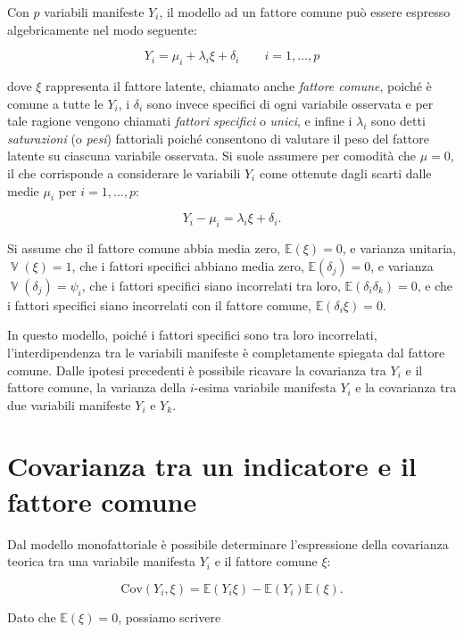 \documentclass[
  11pt,
]{krantz}
\DeclareMathOperator{\V}{\mathbb{V}} %
\newcommand{\E}{\mathbb{E}} %
\theoremstyle{definition}
\theoremstyle{definition}
\theoremstyle{definition}
\theoremstyle{definition}
\theoremstyle{remark}
\begin{document}
Con \(p\) variabili manifeste \(Y_i\), il modello ad un fattore comune può essere espresso algebricamente nel modo seguente:

\[
Y_i = \mu_i + \lambda_{i} \xi + \delta_i \qquad i=1, \dots, p
\]

dove \(\xi\) rappresenta il fattore latente, chiamato anche \emph{fattore comune}, poiché è comune a tutte le \(Y_i\), i \(\delta_i\) sono invece specifici di ogni variabile osservata e per tale ragione vengono chiamati \emph{fattori specifici} o \emph{unici}, e infine i \(\lambda_i\) sono detti \emph{saturazioni} (o \emph{pesi}) fattoriali poiché consentono di valutare il peso del fattore latente su ciascuna variabile osservata. Si suole assumere per comodità che \(\mu=0\), il che corrisponde a considerare le variabili \(Y_i\) come ottenute dagli scarti dalle medie \(\mu_i\) per \(i = 1, \dots, p\):

\[
Y_i -\mu_i = \lambda_i \xi + \delta_i.
\]

Si assume che il fattore comune abbia media zero, \(\E(\xi)=0\), e varianza unitaria, \(\V(\xi)=1\), che i fattori specifici abbiano media zero, \(\E(\delta_j)=0\), e varianza \(\V(\delta_j)=\psi_{i}\), che i fattori specifici siano incorrelati tra loro, \(\E(\delta_i \delta_k)=0\), e che i fattori specifici siano incorrelati con il fattore comune, \(\E(\delta_i \xi)=0\).

In questo modello, poiché i fattori specifici sono tra loro incorrelati, l'interdipendenza tra le variabili manifeste è completamente spiegata dal fattore comune. Dalle ipotesi precedenti è possibile ricavare la covarianza tra \(Y_i\) e il fattore comune, la varianza della \(i\)-esima variabile manifesta \(Y_i\) e la covarianza tra due variabili manifeste \(Y_i\) e \(Y_k\).

\hypertarget{covarianza-tra-un-indicatore-e-il-fattore-comune}{%
\section{Covarianza tra un indicatore e il fattore comune}\label{covarianza-tra-un-indicatore-e-il-fattore-comune}}

Dal modello monofattoriale è possibile determinare l'espressione della covarianza teorica tra una variabile manifesta \(Y_i\) e il fattore comune \(\xi\):

\[
\mbox{Cov}(Y_i,\xi)=\E(Y_i \xi)-\E(Y_i)\E(\xi).
\]

Dato che \(\E(\xi)=0\), possiamo scrivere
\end{document}
